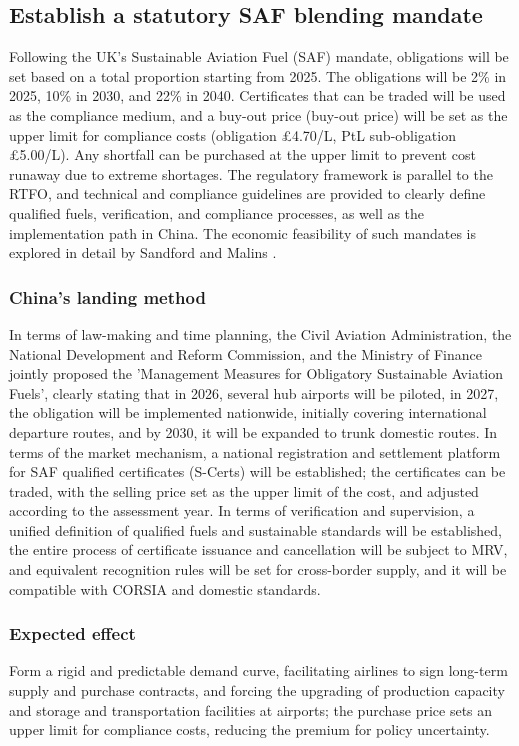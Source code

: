 \documentclass[a4paper,11pt]{article}
\begin{document}
\subsection{Establish a statutory SAF blending mandate}
Following the UK's Sustainable Aviation Fuel (SAF) mandate, obligations will be set based on a total proportion starting from 2025. The obligations will be 2\% in 2025, 10\% in 2030, and 22\% in 2040. Certificates that can be traded will be used as the compliance medium, and a buy-out price (buy-out price) will be set as the upper limit for compliance costs (obligation £4.70/L, PtL sub-obligation £5.00/L). Any shortfall can be purchased at the upper limit to prevent cost runaway due to extreme shortages. The regulatory framework is parallel to the RTFO, and technical and compliance guidelines are provided to clearly define qualified fuels, verification, and compliance processes, as well as the implementation path in China. The economic feasibility of such mandates is explored in detail by Sandford and Malins \cite{sandford2024}.

\subsubsection{China's landing method}
In terms of law-making and time planning, the Civil Aviation Administration, the National Development and Reform Commission, and the Ministry of Finance jointly proposed the 'Management Measures for Obligatory Sustainable Aviation Fuels', clearly stating that in 2026, several hub airports will be piloted, in 2027, the obligation will be implemented nationwide, initially covering international departure routes, and by 2030, it will be expanded to trunk domestic routes. In terms of the market mechanism, a national registration and settlement platform for SAF qualified certificates (S-Certs) will be established; the certificates can be traded, with the selling price set as the upper limit of the cost, and adjusted according to the assessment year. In terms of verification and supervision, a unified definition of qualified fuels and sustainable standards will be established, the entire process of certificate issuance and cancellation will be subject to MRV, and equivalent recognition rules will be set for cross-border supply, and it will be compatible with CORSIA and domestic standards.

\subsubsection{Expected effect}
Form a rigid and predictable demand curve, facilitating airlines to sign long-term supply and purchase contracts, and forcing the upgrading of production capacity and storage and transportation facilities at airports; the purchase price sets an upper limit for compliance costs, reducing the premium for policy uncertainty.
\end{document}
